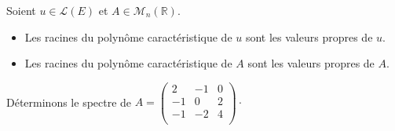 \documentclass[french,11pt,twoside]{VcCours}
\begin{document}
\begin{Proposition}{} Soient $u \in \mathcal{L}(E)$ et $A \in \mathcal{M}_n(\mathbb{R})$.
\begin{itemize}
\item Les racines du polynôme caractéristique de $u$ sont les valeurs propres de $u$.
\item Les racines du polynôme caractéristique de $A$ sont les valeurs propres de $A$.
\end{itemize}
\end{Proposition}



\begin{Exemple}{} Déterminons le spectre de $A = \begin{pmatrix}
2 & -1 & 0 \\
-1 & 0 & 2 \\
-1 & -2 & 4 \\
\end{pmatrix} \cdot$
%

\vspace{6cm}
\end{Exemple}
\end{document}
